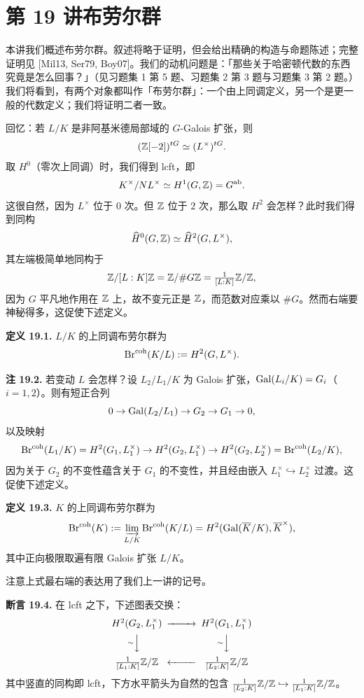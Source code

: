 \section*{第 19 讲\quad 布劳尔群}

本讲我们概述布劳尔群。叙述将略于证明，但会给出精确的构造与命题陈述；完整证明见 [Mil13, Ser79, Boy07]。我们的动机问题是：「那些关于哈密顿代数的东西究竟是怎么回事？」（见习题集 1 第 5 题、习题集 2 第 3 题与习题集 3 第 2 题。）我们将看到，有两个对象都叫作「布劳尔群」：一个由上同调定义，另一个是更一般的代数定义；我们将证明二者一致。

回忆：若 $L/K$ 是非阿基米德局部域的 $G$-Galois 扩张，则
\[
(\mathbb{Z}[-2])^{tG}\simeq (L^\times)^{tG}.
\]
取 $H^0$（零次上同调）时，我们得到 lcft，即
\[
K^\times/NL^\times\simeq H^1(G,\mathbb{Z})=G^{\mathrm{ab}}.
\]
这很自然，因为 $L^\times$ 位于 $0$ 次。但 $\mathbb{Z}$ 位于 $2$ 次，那么取 $H^2$ 会怎样？此时我们得到同构
\[
\widehat H^0(G,\mathbb{Z})\simeq\widehat H^2(G,L^\times),
\]
其左端极简单地同构于
\[
\mathbb{Z}/[L:K]\mathbb{Z}=\mathbb{Z}/\#G\mathbb{Z}=\tfrac{1}{[L:K]}\mathbb{Z}/\mathbb{Z},
\]
因为 $G$ 平凡地作用在 $\mathbb{Z}$ 上，故不变元正是 $\mathbb{Z}$，而范数对应乘以 $\#G$。然而右端要神秘得多，这促使下述定义。

\textbf{定义 19.1.} $L/K$ 的上同调布劳尔群为
\[
\operatorname{Br}^{\mathrm{coh}}(K/L):=H^2(G,L^\times).
\]

\textbf{注 19.2.} 若变动 $L$ 会怎样？设 $L_2/L_1/K$ 为 Galois 扩张，$\operatorname{Gal}(L_i/K)=G_i$（$i=1,2$）。则有短正合列
\[
0\to \operatorname{Gal}(L_2/L_1)\to G_2\to G_1\to 0,
\]
以及映射
\[
\operatorname{Br}^{\mathrm{coh}}(L_1/K)=H^2(G_1,L_1^\times)\to H^2(G_2,L_1^\times)\to H^2(G_2,L_2^\times)=\operatorname{Br}^{\mathrm{coh}}(L_2/K),
\]
因为关于 $G_2$ 的不变性蕴含关于 $G_1$ 的不变性，并且经由嵌入 $L_1^\times\hookrightarrow L_2^\times$ 过渡。这促使下述定义。

\textbf{定义 19.3.} $K$ 的上同调布劳尔群为
\[
\operatorname{Br}^{\mathrm{coh}}(K):=\varinjlim_{L/K}\operatorname{Br}^{\mathrm{coh}}(K/L)=H^2(\operatorname{Gal}(\overline K/K),\overline K^\times),
\]
其中正向极限取遍有限 Galois 扩张 $L/K$。

注意上式最右端的表达用了我们上一讲的记号。

\textbf{断言 19.4.} 在 lcft 之下，下述图表交换：
\[
\begin{CD}
H^2(G_2,L_1^\times) @>>> H^2(G_1,L_1^\times)\\
@V{\sim}VV @V{\sim}VV\\
\tfrac{1}{[L_1:K]}\Z/\Z @<<< \tfrac{1}{[L_2:K]}\Z/\Z
\end{CD}
\]
其中竖直的同构即 lcft，下方水平箭头为自然的包含 $\tfrac{1}{[L_2:K]}\mathbb{Z}/\mathbb{Z}\hookrightarrow\tfrac{1}{[L_1:K]}\mathbb{Z}/\mathbb{Z}$。

